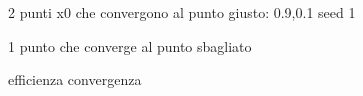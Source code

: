 \documentclass[a4paper,11pt]{article}
\begin{document}
2 punti x0 che convergono al punto giusto: 0.9,0.1 seed 1

1 punto che converge al punto sbagliato

efficienza convergenza

%
%
%	
%
%
%
%
%
%
%	
%	
	
	
	
	
	
	
	
	
	
	
	
	
\end{document}

